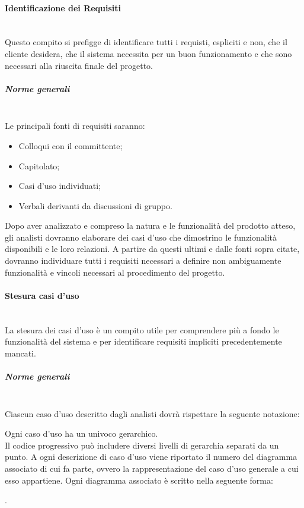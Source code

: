 \paragraph{Identificazione dei Requisiti} \hfill \\
Questo compito si prefigge di identificare tutti i requisti, espliciti e non, che il cliente desidera, che il sistema necessita per un buon funzionamento e che sono necessari alla riuscita finale del progetto.

\subparagraph{Norme generali} \hfill \\
Le principali fonti di requisiti saranno:
\begin{itemize}
\item Colloqui con il committente;
\item Capitolato;
\item Casi d'uso individuati;
\item Verbali derivanti da discussioni di gruppo.
\end{itemize}
Dopo aver analizzato e compreso la natura e le funzionalità del prodotto atteso, gli analisti dovranno elaborare dei casi d'uso che dimostrino le funzionalità disponibili e le loro relazioni.
A partire da questi ultimi e dalle fonti sopra citate, dovranno individuare tutti i requisiti necessari a definire non ambiguamente funzionalità e vincoli necessari al procedimento del progetto.


\paragraph{Stesura casi d'uso} \hfill \\
La stesura dei casi d'uso è un compito utile per comprendere più a fondo le funzionalità del sistema e per identificare requisiti impliciti precedentemente mancati.

\subparagraph{Norme generali} \hfill \\

Ciascun caso d'uso descritto dagli analisti dovrà rispettare la seguente notazione:
\begin{center}
\end{center}
Ogni caso d'uso ha un  univoco gerarchico.\\
Il codice progressivo può includere diversi livelli di gerarchia separati da un punto.
A ogni descrizione di caso d'uso viene riportato il numero del diagramma associato di cui fa parte, ovvero la rappresentazione del caso d'uso generale a cui esso appartiene.
Ogni diagramma associato è scritto nella seguente forma:
\begin{center}
.
\end{center}

